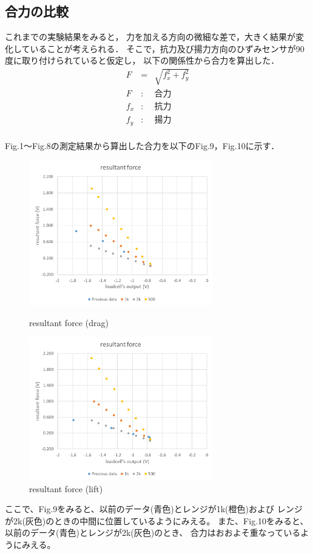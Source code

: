 \documentclass[twocolumn,a4j]{jsarticle}
\begin{document}
\subsection{合力の比較}
これまでの実験結果をみると，
力を加える方向の微細な差で，大きく結果が変化していることが考えられる．
そこで，抗力及び揚力方向のひずみセンサが90度に取り付けられていると仮定し，
以下の関係性から合力を算出した．
\begin{eqnarray*}
    F &=& \sqrt{f_x ^2 + f_y ^2} \\
    F &:& 合力\\
    f_x &:& 抗力\\
    f_y &:& 揚力\\
\end{eqnarray*}\par
Fig.1～Fig.8の測定結果から算出した合力を以下のFig.9，Fig.10に示す．
\begin{figure}[htbp]
    \footnotesize
    \begin{center}
        \includegraphics[width=80mm]{../images/resultantforce_drag.png}
        \caption{resultant force (drag)}
        \includegraphics[width=80mm]{../images/resultantforce_lift.png}
        \caption{resultant force (lift)}
    \end{center}
\end{figure}\par
ここで、Fig.9をみると、以前のデータ(青色)とレンジが1k(橙色)および
レンジが2k(灰色)のときの中間に位置しているようにみえる。
また、Fig.10をみると、以前のデータ(青色)とレンジが2k(灰色)のとき、
合力はおおよそ重なっているようにみえる。
\end{document}
